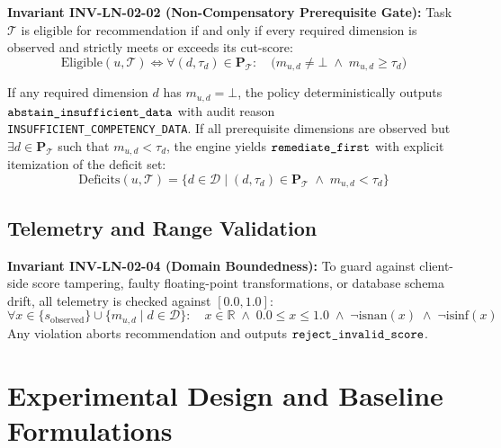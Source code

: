 \documentclass[11pt,a4paper]{article}
\begin{document}
\textbf{Invariant INV-LN-02-02 (Non-Compensatory Prerequisite Gate):}
Task $\mathcal{T}$ is eligible for recommendation if and only if every required dimension is observed and strictly meets or exceeds its cut-score:
\begin{equation}
    \text{Eligible}(u, \mathcal{T}) \iff \forall (d, \tau_d) \in \mathbf{P}_{\mathcal{T}}:\quad \Big( m_{u, d} \neq \bot \;\wedge\; m_{u, d} \ge \tau_d \Big)
\end{equation}

If any required dimension $d$ has $m_{u, d} = \bot$, the policy deterministically outputs $\text{\texttt{abstain\_insufficient\_data}}$ with audit reason \texttt{INSUFFICIENT\_COMPETENCY\_DATA}. If all prerequisite dimensions are observed but $\exists d \in \mathbf{P}_{\mathcal{T}}$ such that $m_{u, d} < \tau_d$, the engine yields $\text{\texttt{remediate\_first}}$ with explicit itemization of the deficit set:
\begin{equation}
    \text{Deficits}(u, \mathcal{T}) = \big\{ d \in \mathcal{D} \mid (d, \tau_d) \in \mathbf{P}_{\mathcal{T}} \;\wedge\; m_{u, d} < \tau_d \big\}
\end{equation}

\subsection{Telemetry and Range Validation}

\textbf{Invariant INV-LN-02-04 (Domain Boundedness):}
To guard against client-side score tampering, faulty floating-point transformations, or database schema drift, all telemetry is checked against $[0.0, 1.0]$:
\begin{equation}
    \forall x \in \{s_{\text{observed}}\} \cup \{m_{u, d} \mid d \in \mathcal{D}\}:\quad x \in \mathbb{R} \;\wedge\; 0.0 \le x \le 1.0 \;\wedge\; \neg\text{isnan}(x) \;\wedge\; \neg\text{isinf}(x)
\end{equation}
Any violation aborts recommendation and outputs $\text{\texttt{reject\_invalid\_score}}$.

\section{Experimental Design and Baseline Formulations}
\end{document}
